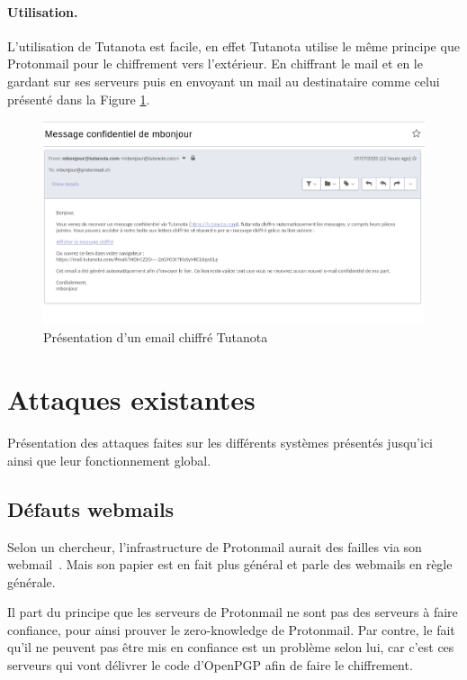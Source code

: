 \paragraph*{Utilisation.}
L'utilisation de Tutanota est facile, en effet Tutanota utilise le même principe que Protonmail pour le chiffrement vers l'extérieur. En chiffrant le mail et en le gardant sur ses serveurs puis en envoyant un mail au destinataire comme celui présenté dans la Figure \ref{fig:TutanotaPres}.

\begin{figure}[h!]
	\includegraphics[width=14cm]{images/tutanotaPresentation.png}
	\centering
	\caption{Présentation d'un email chiffré Tutanota}
	\label{fig:TutanotaPres}
\end{figure}

\section{Attaques existantes}
Présentation des attaques faites sur les différents systèmes présentés jusqu'ici ainsi que leur fonctionnement global.
\subsection{Défauts webmails}
Selon un chercheur, l'infrastructure de Protonmail aurait des failles via son webmail~\cite{DBLP:journals/iacr/Kobeissi18a}. Mais son papier est en fait plus général et parle des webmails en règle générale.

Il part du principe que les serveurs de Protonmail ne sont pas des serveurs à faire confiance, pour ainsi prouver le zero-knowledge de Protonmail. Par contre, le fait qu'il ne peuvent pas être mis en confiance est un problème selon lui, car c'est ces serveurs qui vont délivrer le code d'OpenPGP afin de faire le chiffrement.

